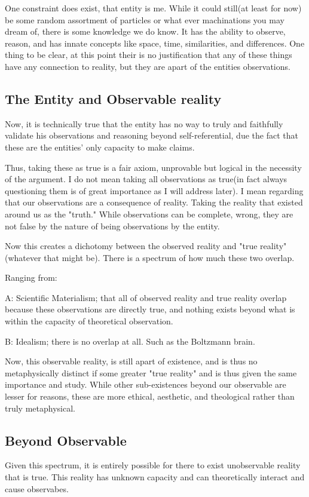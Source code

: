 One constraint does exist, that entity is me. While it could still(at least for now)
be some random assortment of particles or what ever machinations you may dream of, there is some knowledge we do know. It has the ability to observe,
reason, and has innate concepts like space, time, similarities, and differences. One thing to be clear, at this point their is no justification that
any of these things have any connection to reality, but they are apart of the entities observations.

\subsection{The Entity and Observable reality}
Now, it is technically true that the entity has no way to truly and faithfully validate his observations and reasoning beyond self-referential, due
the fact that these are the entities' only capacity to make claims.

Thus, taking these as true is a fair axiom, unprovable but logical in the necessity of the argument. I do not mean taking all observations as true(in fact always questioning them is of great importance as I will
address later). I mean regarding that our observations are a consequence of reality. Taking the reality that existed around us as the "truth." While
observations can be complete, wrong, they are not false by the nature of being observations by the entity.

Now this creates a dichotomy between the observed reality and "true reality"(whatever that might be). There is a spectrum of how much these two overlap.

Ranging from:

A: Scientific Materialism; that all of observed reality and true reality overlap because these observations are directly true, and nothing exists beyond
what is within the capacity of theoretical observation.

B: Idealism; there is no overlap at all. Such as the Boltzmann brain.

Now, this observable reality, is still apart of existence, and is thus no metaphysically distinct if some greater "true reality" and is thus given the
same importance and study. While other sub-existences beyond our observable are lesser for reasons, these are more ethical, aesthetic, and theological
rather than truly metaphysical.

\subsection{Beyond Observable}
Given this spectrum, it is entirely possible for there to exist unobservable reality that is true. This reality has unknown capacity and can theoretically
interact and cause observabes.

